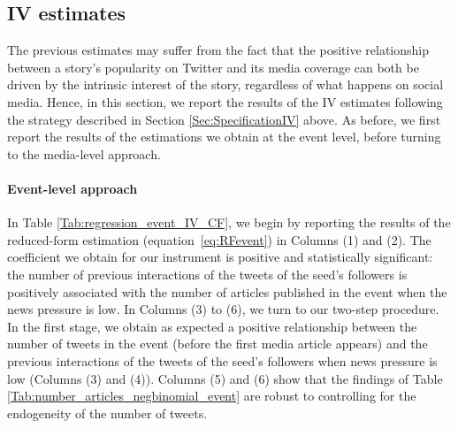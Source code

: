 \subsection{IV estimates\label{Sec:ResultsIV}}

The previous estimates may suffer from the fact that the positive relationship between a story's popularity on Twitter and its media coverage can both be driven by the intrinsic interest of the story, regardless of what happens on social media. Hence, in this section, we report the results of the IV estimates following the strategy described in Section \ref{Sec:SpecificationIV} above. As before, we first report the results of the estimations we obtain at the event level, before turning to the media-level approach.


\paragraph{Event-level approach}

In Table \ref{Tab:regression_event_IV_CF}, we begin by reporting the results of the reduced-form estimation (equation~\ref{eq:RFevent}) in Columns (1) and (2). The coefficient we obtain for our instrument is positive and statistically significant: the number of previous interactions of the tweets of the seed's followers is positively associated with the number of articles published in the event when the news pressure is low. In Columns (3) to (6), we turn to our two-step procedure. In the first stage, we obtain as expected a positive relationship between the number of tweets in the event (before the first media article appears) and the previous interactions of the tweets of the seed's followers when news pressure is low (Columns (3) and (4)). Columns (5) and (6) show that the findings of Table \ref{Tab:number_articles_negbinomial_event} are robust to controlling for the endogeneity of the number of tweets.


